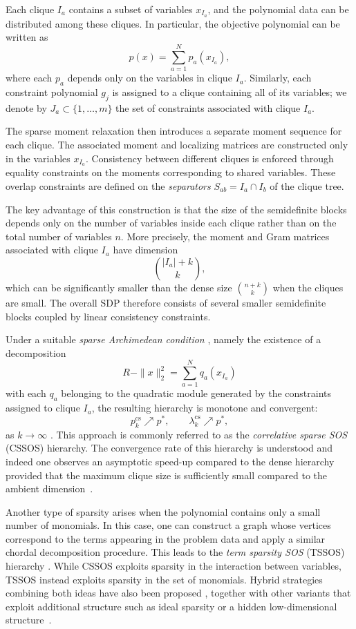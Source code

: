 \documentclass[11pt,a4paper]{article}
\theoremstyle{definition}
\begin{document}
Each clique $I_a$ contains a subset of variables $x_{I_a}$, and the
polynomial data can be distributed among these cliques.
In particular, the objective polynomial can be written as
\[
p(x)=\sum_{a=1}^N p_a(x_{I_a}),
\]
where each $p_a$ depends only on the variables in clique $I_a$.
Similarly, each constraint polynomial $g_j$ is assigned to a clique
containing all of its variables; we denote by
$J_a\subset\{1,\dots,m\}$ the set of constraints associated with clique
$I_a$.

The sparse moment relaxation then introduces a separate moment sequence
for each clique.
The associated moment and localizing matrices are constructed only in
the variables $x_{I_a}$.
Consistency between different cliques is enforced through equality
constraints on the moments corresponding to shared variables.
These overlap constraints are defined on the \emph{separators}
$S_{ab}=I_a\cap I_b$ of the clique tree.

The key advantage of this construction is that the size of the
semidefinite blocks depends only on the number of variables inside each
clique rather than on the total number of variables $n$.
More precisely, the moment and Gram matrices associated with clique
$I_a$ have dimension
\[
\binom{|I_a|+k}{k},
\]
which can be significantly smaller than the dense size
$\binom{n+k}{k}$ when the cliques are small.
The overall SDP therefore consists of several smaller semidefinite
blocks coupled by linear consistency constraints.

Under a suitable \emph{sparse Archimedean condition} \cite{Lasserre2006}, namely the
existence of a decomposition
\[
R-\|x\|_2^2 = \sum_{a=1}^N q_a(x_{I_a})
\]
with each $q_a$ belonging to the quadratic module generated by the
constraints assigned to clique $I_a$, the resulting hierarchy is
monotone and convergent:
\[
p_k^{\mathrm{cs}}\nearrow p^*, \qquad
\lambda_k^{\mathrm{cs}}\nearrow p^*,
\]
as $k\to\infty$ \cite{Lasserre2006,Waki2006,Grimm2007}.
This approach is commonly referred to as the
\emph{correlative sparse SOS} (CSSOS) hierarchy. The convergence rate of this hierarchy is understood and indeed one observes an asymptotic speed-up compared to the dense hierarchy provided that the maximum clique size is sufficiently small compared to the ambient dimension~\cite{korda2025convergence}. 

Another type of sparsity arises when the polynomial contains only a
small number of monomials.
In this case, one can construct a graph whose vertices correspond to the
terms appearing in the problem data and apply a similar chordal
decomposition procedure.
This leads to the \emph{term sparsity SOS} (TSSOS) hierarchy
\cite{Wang2021}.
While CSSOS exploits sparsity in the interaction between variables,
TSSOS instead exploits sparsity in the set of monomials. Hybrid strategies combining both ideas have also been proposed
\cite{Wang2022}, together with other variants that exploit additional
structure such as ideal sparsity \cite{Korda2024} or a hidden low-dimensional structure~\cite{lasserre2022optimization}.
\end{document}
